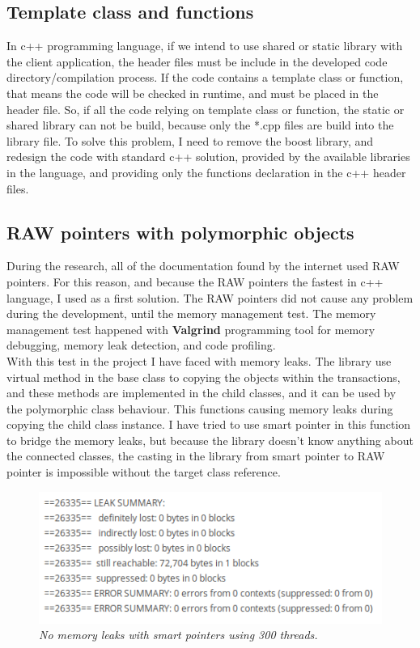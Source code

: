 \documentclass[12pt]{article}
\begin{document}
\subsection{Template class and functions}
In c++ programming language, if we intend to use shared or static library with the client application, the header files must be include in the developed code directory/compilation process. If the code contains a template class or function, that means the code will be checked in runtime, and must be placed in the header file. So, if all the code relying on template class or function, the static or shared library can not be build, because only the *.cpp files are build into the library file. To solve this problem, I need to remove the boost library, and redesign the code with standard c++ solution, provided by the available libraries in the  language, and providing only the functions declaration in the c++ header files.

\subsection{RAW pointers with polymorphic objects}
During the research, all of the documentation found by the internet used RAW pointers. For this reason, and because the RAW pointers the fastest in c++ language, I used as a first solution. The RAW pointers did not cause any problem during the development, until the memory management test. The memory management test happened with \textbf{Valgrind} programming tool for memory debugging, memory leak detection, and code profiling.\\

With this test in the project I have faced with memory leaks. The library use virtual method in the base class to copying the objects within the transactions, and these methods are implemented in the child classes, and it can be used by the polymorphic class behaviour. This functions causing memory leaks during copying the child class instance. I have tried to use smart pointer in this function to bridge the memory leaks, but because the library doesn't know anything about the connected classes, the casting in the library from smart pointer to RAW pointer is impossible without the target class reference.

\begin{figure}[h!]
\centering
\includegraphics[scale=0.7]{Pictures/memory.png}
\caption*{\textit{\color{gray}No memory leaks with smart pointers using 300 threads.}}
\end{figure}
\end{document}

